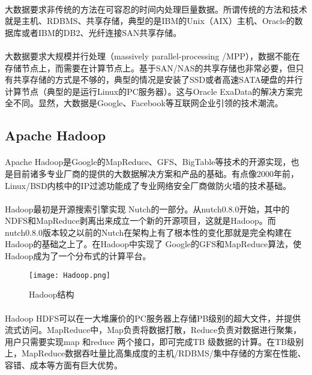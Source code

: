 \documentclass[12pt]{article}
\begin{document}
\paragraph{}
大数据要求非传统的方法在可容忍的时间内处理巨量数据。所谓传统的方法和技术就是主机、RDBMS、共享存储，典型的是IBM的Unix（AIX）主机、Oracle的数据库或者IBM的DB2、光纤连接SAN共享存储。
\paragraph{}
大数据要求大规模并行处理（massively parallel-processing /MPP），数据不能在存储节点上，而需要在计算节点上。基于SAN/NAS的共享存储也非常必要，但只有共享存储的方式是不够的，典型的情况是安装了SSD或者高速SATA硬盘的并行计算节点（典型的是运行Linux的PC服务器）。这与Oracle ExaData的解决方案完全不同。显然，大数据是Google、Facebook等互联网企业引领的技术潮流。

\subsection{Apache Hadoop}
\paragraph{}
Apache Hadoop是Google的MapReduce、GFS、BigTable等技术的开源实现，也是目前诸多专业厂商的提供的大数据解决方案和产品的基础。有点像2000年前，Linux/BSD内核中的IP过滤功能成了专业网络安全厂商做防火墙的技术基础。
\paragraph{}
Hadoop最初是开源搜索引擎实现 Nutch的一部分。从nutch0.8.0开始，其中的NDFS和MapReduce剥离出来成立一个新的开源项目，这就是Hadoop。而 nutch0.8.0版本较之以前的Nutch在架构上有了根本性的变化那就是完全构建在Hadoop的基础之上了。在Hadoop中实现了 Google的GFS和MapReduce算法，使Hadoop成为了一个分布式的计算平台。
\begin{figure}[htbp]
\small
\centering
\texttt{[image: Hadoop.png]}
\caption{Hadoop结构}
\label{fig:Hadoop}
\end{figure}
 
\paragraph{}
Hadoop HDFS可以在一大堆廉价的PC服务器上存储PB级别的超大文件，并提供流式访问。MapReduce中，Map负责将数据打散，Reduce负责对数据进行聚集，用户只需要实现map 和reduce 两个接口，即可完成TB 级数据的计算。在TB级别上，MapReduce数据吞吐量比高集成度的主机/RDBMS/集中存储的方案在性能、容错、成本等方面有巨大优势。
\end{document}
